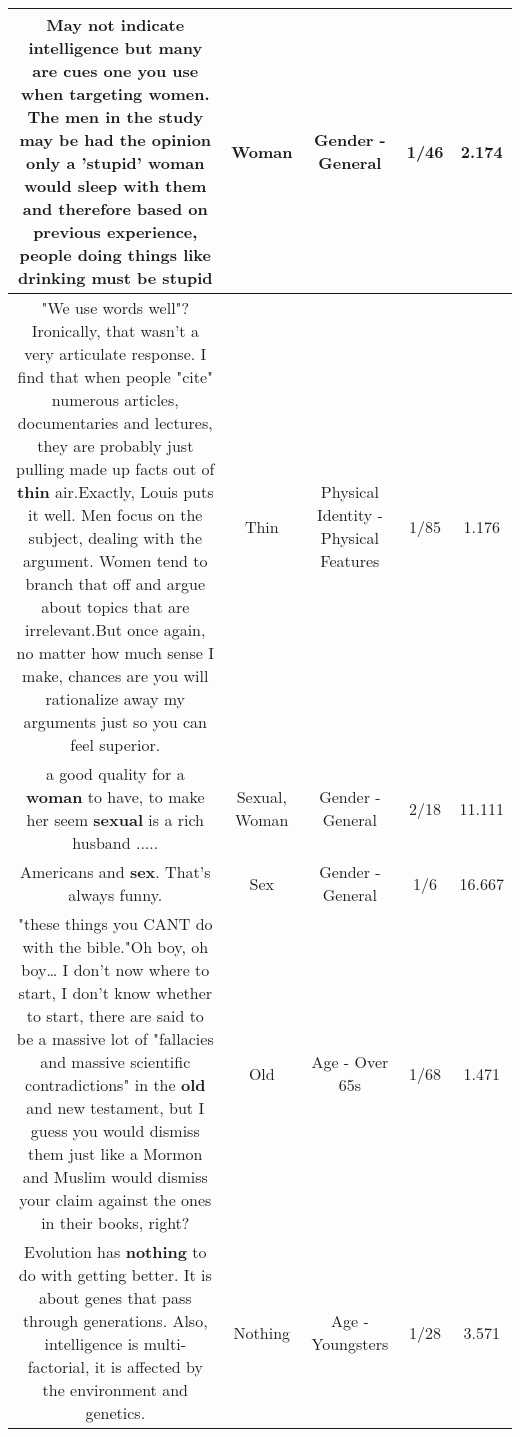 \documentclass[11pt]{article}
\newlength\mylength
\begin{document}
\begin{center}
\begin{longtable}{|C{.65\mylength}|C{.30\mylength}|C{.12\mylength}|C{.12\mylength}|C{.12\mylength}|}
  \small May not indicate intelligence but many are cues one you use when targeting women. The men in the study may be had the opinion only a 'stupid' \textbf{woman} would sleep with them and therefore based on previous experience, people doing things like drinking must be stupid\normalsize   & Woman & Gender - General & 1/46 & 2.174 \\  \hline
  \small "We use words well"? Ironically, that wasn't a very articulate response. I find that when people "cite" numerous articles, documentaries and lectures, they are probably just pulling made up facts out of \textbf{thin} air.Exactly, Louis puts it well. Men focus on the subject, dealing with the argument. Women tend to branch that off and argue about topics that are irrelevant.But once again, no matter how much sense I make, chances are you will rationalize away my arguments just so you can feel superior.\normalsize   & Thin & Physical Identity - Physical Features & 1/85 & 1.176 \\  \hline
  \small a good quality for a \textbf{woman} to have, to make her seem \textbf{sexual} is a rich husband .....\normalsize   & Sexual, Woman & Gender - General & 2/18 & 11.111 \\  \hline
  \small Americans and \textbf{sex}. That's always funny.\normalsize   & Sex & Gender - General & 1/6 & 16.667 \\  \hline
  \small "these things you CANT do with the bible."Oh boy, oh boy… I don't now where to start, I don't know whether to start, there are said to be a massive lot of "fallacies and massive scientific contradictions" in the \textbf{old} and new testament, but I guess you would dismiss them just like a Mormon and Muslim would dismiss your claim against the ones in their books, right?\normalsize   & Old & Age - Over 65s & 1/68 & 1.471 \\  \hline
  \small Evolution has \textbf{nothing} to do with getting better. It is about genes that pass through generations. Also, intelligence is multi-factorial, it is affected by the environment and genetics.\normalsize   & Nothing & Age - Youngsters & 1/28 & 3.571 \\  \hline

\end{longtable}
\end{center}
\end{document}
